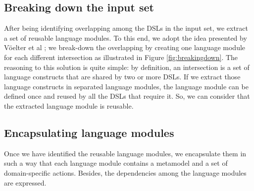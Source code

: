 
\subsection{Breaking down the input set}

After being identifying overlapping among the DSLs in the input set, we extract a set of reusable language modules. To this end, we adopt the idea presented by V\"oelter et al \cite[p. 60-61]{voelter:2013}; we break-down the overlapping by creating one language module for each different intersection as illustrated in Figure \ref{fig:breakingdown}. The reasoning to this solution is quite simple: by definition, an intersection is a set of language constructs that are shared by two or more DSLs. If we extract those language constructs in separated language modules, the language module can be defined once and reused by all the DSLs that require it. So, we can consider that the extracted language module is reusable. 


\subsection{Encapsulating language modules}

Once we have identified the reusable language modules, we encapsulate them in such a way that each language module contains a metamodel and a set of domain-specific actions. Besides, the dependencies among the language modules are expressed. %

